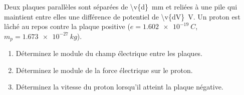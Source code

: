 Deux plaques parallèles sont séparées de \qty{\v{d}}{mm} et reliées à une pile qui maintient entre elles une différence de potentiel de \qty{\v{dV}}{V}. Un proton est lâché au repos contre la plaque positive ($e = \qty{1.602e-19}{C}$, $m_p = \qty{1.673e-27}{kg}$).

\begin{enumerate}[label=\alph*)]
    \item Déterminez le module du champ électrique entre les plaques.
    \item Déterminez le module de la force électrique sur le proton.
    \item Déterminez la vitesse du proton lorsqu'il atteint la plaque négative.
\end{enumerate}
